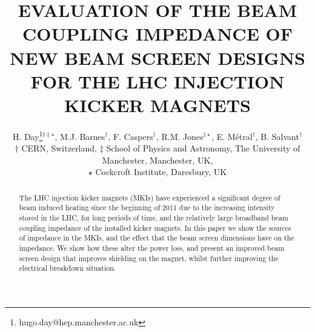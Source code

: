 \documentclass{JAC2003}
\begin{document}
\title{EVALUATION OF THE BEAM COUPLING IMPEDANCE OF NEW BEAM SCREEN DESIGNS FOR THE LHC INJECTION KICKER MAGNETS}
\author{H. Day\thanks{hugo.day@hep.manchester.ac.uk}$^{\dagger\ddagger\star}$, M.J. Barnes$^{\dagger}$, F. Caspers$^{\dagger}$, R.M. Jones$^{\ddagger \star}$, E. Métral$^{\dagger}$, B. Salvant$^{\dagger}$ \\
$\dagger$ CERN, Switzerland,
$\ddagger$ School of Physics and Astronomy, The University of Manchester, Manchester, UK,\\
$\star$ Cockcroft Institute, Daresbury, UK 
}

\maketitle 


\begin{abstract}
The LHC injection kicker magnets (MKIs) have experienced a significant degree of beam induced heating since the beginning of 2011 due to the increasing intensity stored in the LHC, for long periods of time, and the relatively large broadband beam coupling impedance of the installed kicker magnets. In this paper we show the sources of impedance in the MKIs, and the effect that the beam screen dimensions have on the impedance. We show how these alter the power loss, and present an improved beam screen design that improves shielding on the magnet, whilst further improving the electrical breakdown situation.
\end{abstract}


%
%
%
\end{document}
